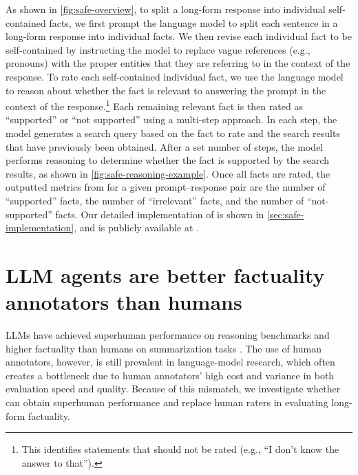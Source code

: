 \documentclass{article}
\theoremstyle{plain}
\theoremstyle{definition}
\theoremstyle{remark}
\begin{document}
As shown in \cref{fig:safe-overview}, to split a long-form response into individual self-contained facts, we first prompt the language model to split each sentence in a long-form response into individual facts.
We then revise each individual fact to be self-contained by instructing the model to replace vague references (e.g., pronouns) with the proper entities that they are referring to in the context of the response.
To rate each self-contained individual fact, we use the language model to reason about whether the fact is relevant to answering the prompt in the context of the response.\footnote{This identifies statements that should not be rated (e.g., ``I don't know the answer to that'').}
Each remaining relevant fact is then rated as ``supported'' or ``not supported'' using a multi-step approach.
In each step, the model generates a search query based on the fact to rate and the search results that have previously been obtained.
After a set number of steps, the model performs reasoning to determine whether the fact is supported by the search results, as shown in \cref{fig:safe-reasoning-example}.
Once all facts are rated, the outputted metrics from \safe{} for a given prompt--response pair are the number of ``supported'' facts, the number of ``irrelevant'' facts, and the number of ``not-supported'' facts.
Our detailed implementation of \safe{} is shown in \cref{sec:safe-implementation}, and \safe{} is publicly available at \safeurl{}.



\section{LLM agents are better factuality annotators than humans}
\label{sec:safe-outperforms-human-annotators}



LLMs have achieved superhuman performance on reasoning benchmarks \citep{bubeck2023sparks,gemini2023,li2022competition} and higher factuality  than humans on summarization tasks \citep{pu2023summarization}.
The use of human annotators, however, is still prevalent in language-model research, which often creates a bottleneck due to human annotators' high cost and variance in both evaluation speed and quality.
Because of this mismatch, we investigate whether \safe{} can obtain superhuman performance and replace human raters in evaluating long-form factuality.
\end{document}
